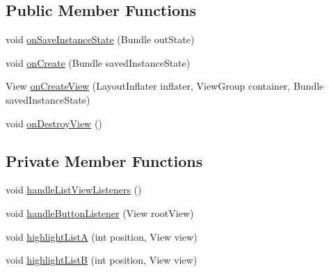 \subsection*{Public Member Functions}
\begin{DoxyCompactItemize}
\item 
void \hyperlink{classorg_1_1buildmlearn_1_1matchtemplate_1_1fragment_1_1MainActivityFragment_ac2d64fe95cb6a5572e4040e1b47760c9}{on\+Save\+Instance\+State} (Bundle out\+State)
\item 
void \hyperlink{classorg_1_1buildmlearn_1_1matchtemplate_1_1fragment_1_1MainActivityFragment_ac85b1fe988a2a65297cf32e49f71e243}{on\+Create} (Bundle saved\+Instance\+State)
\item 
View \hyperlink{classorg_1_1buildmlearn_1_1matchtemplate_1_1fragment_1_1MainActivityFragment_af060df5082178faca6e27fbb54121b38}{on\+Create\+View} (Layout\+Inflater inflater, View\+Group container, Bundle saved\+Instance\+State)
\item 
void \hyperlink{classorg_1_1buildmlearn_1_1matchtemplate_1_1fragment_1_1MainActivityFragment_a1330d78fd549712d94e371a3e5b9dbff}{on\+Destroy\+View} ()
\end{DoxyCompactItemize}
\subsection*{Private Member Functions}
\begin{DoxyCompactItemize}
\item 
void \hyperlink{classorg_1_1buildmlearn_1_1matchtemplate_1_1fragment_1_1MainActivityFragment_ad53c7f1188de3f9b3171e8242cd5246b}{handle\+List\+View\+Listeners} ()
\item 
void \hyperlink{classorg_1_1buildmlearn_1_1matchtemplate_1_1fragment_1_1MainActivityFragment_ae3abf60d5bffe79007fa3c16d741aa33}{handle\+Button\+Listener} (View root\+View)
\item 
void \hyperlink{classorg_1_1buildmlearn_1_1matchtemplate_1_1fragment_1_1MainActivityFragment_a78fa54829ab338a4d5320ef37a53fc52}{highlight\+ListA} (int position, View view)
\item 
void \hyperlink{classorg_1_1buildmlearn_1_1matchtemplate_1_1fragment_1_1MainActivityFragment_a5e4ad540fa7b1f613430a8e1d08fd6c0}{highlight\+ListB} (int position, View view)
\end{DoxyCompactItemize}
